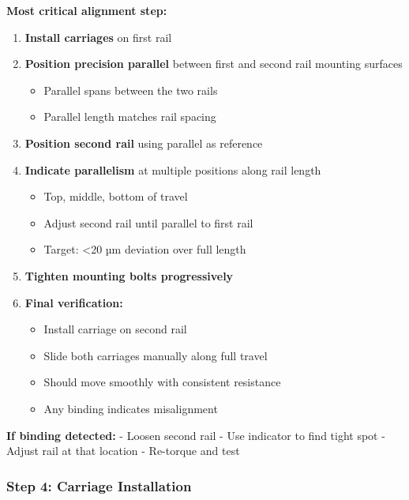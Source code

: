 \documentclass[
]{article}
\providecommand{\tightlist}{%
  \setlength{\itemsep}{0pt}\setlength{\parskip}{0pt}}
\begin{document}
\textbf{Most critical alignment step:}

\begin{enumerate}
\def\labelenumi{\arabic{enumi}.}
\tightlist
\item
  \textbf{Install carriages} on first rail
\item
  \textbf{Position precision parallel} between first and second rail
  mounting surfaces

  \begin{itemize}
  \tightlist
  \item
    Parallel spans between the two rails
  \item
    Parallel length matches rail spacing
  \end{itemize}
\item
  \textbf{Position second rail} using parallel as reference
\item
  \textbf{Indicate parallelism} at multiple positions along rail length

  \begin{itemize}
  \tightlist
  \item
    Top, middle, bottom of travel
  \item
    Adjust second rail until parallel to first rail
  \item
    Target: \textless20 µm deviation over full length
  \end{itemize}
\item
  \textbf{Tighten mounting bolts progressively}
\item
  \textbf{Final verification:}

  \begin{itemize}
  \tightlist
  \item
    Install carriage on second rail
  \item
    Slide both carriages manually along full travel
  \item
    Should move smoothly with consistent resistance
  \item
    Any binding indicates misalignment
  \end{itemize}
\end{enumerate}

\textbf{If binding detected:} - Loosen second rail - Use indicator to
find tight spot - Adjust rail at that location - Re-torque and test

\subsubsection{Step 4: Carriage
Installation}\label{step-4-carriage-installation}
\end{document}
